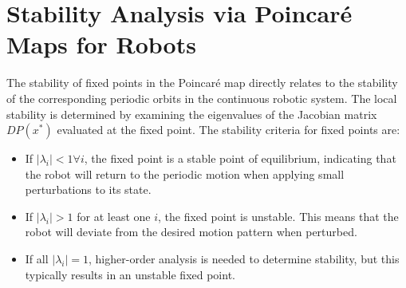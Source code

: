 \section{Stability Analysis via Poincaré Maps for Robots}
The stability of fixed points in the Poincaré map directly relates to the stability of the corresponding periodic orbits in the continuous robotic system. The local stability is determined by examining the eigenvalues of the Jacobian matrix $DP(x^{*})$ evaluated at the fixed point.
The stability criteria for fixed points are:
\begin{itemize}
    \item If $|\lambda_i| < 1 \forall i$, the fixed point is a stable point of equilibrium, indicating that the robot will return to the periodic motion when applying small perturbations to its state.
    \item If $|\lambda_i| > 1$ for at least one $i$, the fixed point is unstable. This means that the robot will deviate from the desired motion pattern when perturbed.
    \item If all $|\lambda_i| = 1$, higher-order analysis is needed to determine stability, but this typically results in an unstable fixed point.
\end{itemize}

